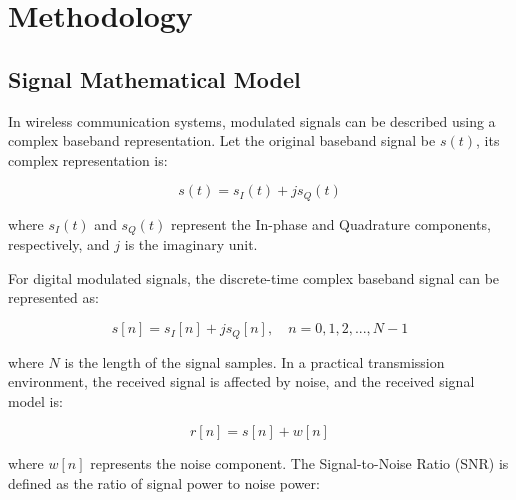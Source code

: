 \documentclass[conference]{IEEEtran}
\begin{document}





\section{Methodology}

\subsection{Signal Mathematical Model}

In wireless communication systems, modulated signals can be described using a complex baseband representation. Let the original baseband signal be $s(t)$, its complex representation is:

\begin{equation}
s(t) = s_I(t) + js_Q(t)
\end{equation}

where $s_I(t)$ and $s_Q(t)$ represent the In-phase and Quadrature components, respectively, and $j$ is the imaginary unit.

For digital modulated signals, the discrete-time complex baseband signal can be represented as:

\begin{equation}
s[n] = s_I[n] + js_Q[n], \quad n = 0, 1, 2, ..., N-1
\end{equation}

where $N$ is the length of the signal samples. In a practical transmission environment, the received signal is affected by noise, and the received signal model is:

\begin{equation}
r[n] = s[n] + w[n]
\end{equation}

where $w[n]$ represents the noise component. The Signal-to-Noise Ratio (SNR) is defined as the ratio of signal power to noise power:
\end{document}
